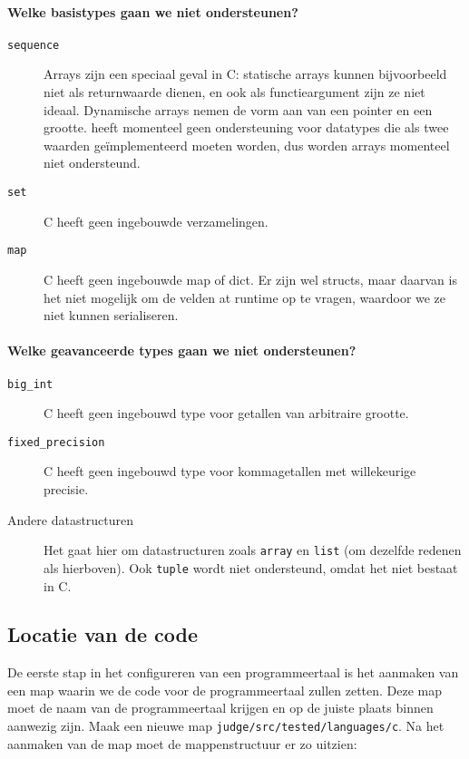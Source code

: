 \paragraph{Welke basistypes gaan we niet ondersteunen?}

\begin{description}
    \item[\texttt{sequence}] Arrays zijn een speciaal geval in C: statische arrays kunnen bijvoorbeeld niet als returnwaarde dienen, en ook als functieargument zijn ze niet ideaal.
    Dynamische arrays nemen de vorm aan van een pointer en een grootte. 
    \tested{} heeft momenteel geen ondersteuning voor datatypes die als twee waarden geïmplementeerd moeten worden, dus worden arrays momenteel niet ondersteund.
    \item[\texttt{set}] C heeft geen ingebouwde verzamelingen.
    \item[\texttt{map}] C heeft geen ingebouwde map of dict.
    Er zijn wel structs, maar daarvan is het niet mogelijk om de velden at runtime op te vragen, waardoor we ze niet kunnen serialiseren.
\end{description}

\paragraph{Welke geavanceerde types gaan we niet ondersteunen?}

\begin{description}
    \item[\texttt{big\_int}] C heeft geen ingebouwd type voor getallen van arbitraire grootte.
    \item[\texttt{fixed\_precision}] C heeft geen ingebouwd type voor kommagetallen met willekeurige precisie.
    \item[Andere datastructuren] Het gaat hier om datastructuren zoals \texttt{array} en \texttt{list} (om dezelfde redenen als hierboven).
    Ook \texttt{tuple} wordt niet ondersteund, omdat het niet bestaat in C\@.
\end{description}

\subsection{Locatie van de code}\label{subsec:locatie-van-de-code}

De eerste stap in het configureren van een programmeertaal is het aanmaken van een map waarin we de code voor de programmeertaal zullen zetten.
Deze map moet de naam van de programmeertaal krijgen en op de juiste plaats binnen \tested{} aanwezig zijn.
Maak een nieuwe map \texttt{judge/src/tested/languages/c}.
Na het aanmaken van de map moet de mappenstructuur er zo uitzien:


